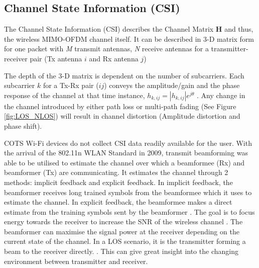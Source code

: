 \subsection{Channel State Information (CSI)}
The Channel State Information (CSI) describes the Channel Matrix \textbf{H} and thus, the wireless MIMO-OFDM channel itself. It can be described in 3-D matrix form for one packet with \textit{M} transmit antennas, \textit{N} receive antennas for a transmitter-receiver pair (Tx antenna $i$ and Rx antenna $j$) \par
The depth of the 3-D matrix is dependent on the number of subcarriers. Each subcarrier $k$ for a Tx-Rx pair ($ij$) conveys the amplitude/gain and the phase response of the channel at that time instance, $h_{k,ij} = |h_{k,ij}|e^{j\theta}$ \citep{OFDM}. Any change in the channel introduced by either path loss or multi-path fading (See Figure \ref{fig:LOS_NLOS}) will result in channel distortion (Amplitude distortion and phase shift).\par 
COTS Wi-Fi devices do not collect CSI data readily available for the user. With the arrival of the 802.11n WLAN Standard in 2009, transmit beamforming was able to be utilised to estimate the channel over which a beamformee (Rx) and beamformer (Tx) are communicating. It estimates the channel through 2 methods: implicit feedback and explicit feedback. In implicit feedback, the beamformer receives long trained symbols from the beamformee which it uses to estimate the channel. In explicit feedback, the beamformee makes a direct estimate from the training symbols sent by the beamformer \citep{full802.11nStandard}. The goal is to focus energy towards the receiver to increase the SNR of the wireless channel \citep{beamforming}. The beamformer can maximise the signal power at the receiver depending on the current state of the channel. In a LOS scenario, it is the transmitter forming a beam to the receiver directly. \citep{beamforming}. This can give great insight into the changing environment between transmitter and receiver. \par
